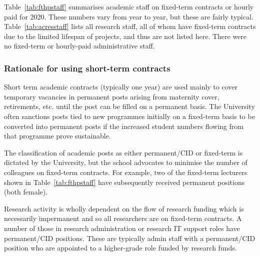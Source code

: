 Table~\ref{tab:fthpstaff} summarises academic staff on fixed-term
contracts or hourly paid for 2020. These numbers vary from year to year, but these are fairly typical.
Table~\ref{tab:acresstaff} lists all research staff, all of whom have fixed-term contracts due to the limited lifespan of projects, and thus are not listed here. 
There were 
no fixed-term or hourly-paid administrative staff. 




\subsubsection{Rationale for using short-term contracts}
\label{rationalecontracts}

Short term academic contracts (typically one year) are used mainly 
to cover temporary vacancies in permanent posts arising from
maternity cover, retirements, etc. until the post can be filled on
a permanent basis. The University often sanctions posts tied
to new programmes initially on a fixed-term basis to be 
converted into permanent posts if the increased student
numbers flowing from that programme prove sustainable.

The classification of academic posts as either permanent/\ac{CID} or
fixed-term is dictated by the University, but the school advocates
to minimise the number of colleagues on fixed-term contracts.
For example, two of the fixed-term lecturers shown in 
Table~\ref{tab:fthpstaff} have subsequently received 
permanent positions (both female).


Research activity is wholly dependent on the flow of research 
funding which is necessarily impermanent and so all researchers 
are on fixed-term contracts. A number of those in research 
administration or research IT support roles have 
permanent/\ac{CID} positions. These are typically admin staff
with a permanent/\ac{CID} position who are appointed to a 
higher-grade role funded by research funds.

